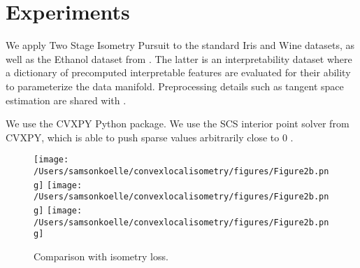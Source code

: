 \section{Experiments}
\label{sec:experiments}

We apply Two Stage Isometry Pursuit to the standard Iris and Wine datasets, as well as the Ethanol dataset from \citet{Koelle2022-no}.
The latter is an interpretability dataset where a dictionary of precomputed interpretable features are evaluated for their ability to parameterize the data manifold.
Preprocessing details such as tangent space estimation are shared with \citet{Koelle2022-no}.

We use the CVXPY Python package.
We use the SCS interior point solver from CVXPY, which is able to push sparse values arbitrarily close to 0 \cite{cvxpy_sparse_solution}.

\begin{figure}
\centering
{}
{\texttt{[image: /Users/samsonkoelle/convexlocalisometry/figures/Figure2b.png]}}
{\texttt{[image: /Users/samsonkoelle/convexlocalisometry/figures/Figure2b.png]}}
{\texttt{[image: /Users/samsonkoelle/convexlocalisometry/figures/Figure2b.png]}}
\caption{Comparison with isometry loss.}
\label{fig:boxplots}
\end{figure}

